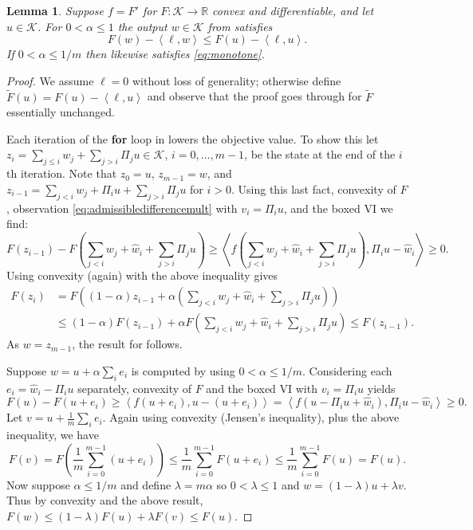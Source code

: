 \documentclass[letterpaper,final,12pt,reqno]{amsart}
\theoremstyle{cstyle}
\newtheorem{lemma}[theorem]{Lemma}
\theoremstyle{cstyle*}
\theoremstyle{dstyle}
\numberwithin{equation}{section}
\numberwithin{figure}{section}
\numberwithin{table}{section}
\numberwithin{theorem}{section}
\newcommand{\RR}{\mathbb{R}}
\newcommand{\cK}{\mathcal{K}}
\newcommand{\ip}[2]{\left<#1,#2\right>}
\begin{document}
\begin{lemma}  Suppose $f=F'$ for $F:\cK\to\RR$ convex and differentiable, and let $u\in\cK$.  For $0<\alpha\le 1$ the output $w \in \cK$ from  satisfies
\begin{equation}
F(w) - \ip{\ell}{w} \le F(u) - \ip{\ell}{u}.  \label{eq:monotone}
\end{equation}
If $0 < \alpha \le 1/m$ then  likewise satisfies \eqref{eq:monotone}.
\end{lemma}

\begin{proof}  We assume $\ell=0$ without loss of generality; otherwise define $\tilde F(u)=F(u) - \ip{\ell}{u}$ and observe that the proof goes through for $\tilde F$ essentially unchanged.

Each iteration of the \textbf{for} loop in  lowers the objective value.  To show this let $z_{i} = \sum_{j\le i} w_j + \sum_{j > i} \Pi_j u \in \cK$, $i=0,\dots,m-1$, be the state at the end of the $i$th iteration.  Note that $z_0=u$, $z_{m-1}=w$, and $z_{i-1} = \sum_{j < i} w_j + \Pi_i u + \sum_{j > i} \Pi_j u$ for $i>0$.  Using this last fact, convexity of $F$, observation \eqref{eq:admissibledifferencemult} with $v_i=\Pi_i u$, and the boxed VI we find:
\begin{equation*}
F(z_{i-1}) - F\left(\sum_{j<i} w_j + \hat w_i + \sum_{j > i} \Pi_j u\right) \ge \ip{f\left(\sum_{j<i} w_j + \hat w_i + \sum_{j > i} \Pi_j u\right)}{\Pi_i u - \hat w_i} \ge 0.
\end{equation*}
Using convexity (again) with the above inequality gives
\begin{align*}
F(z_i) &= F\left((1-\alpha) z_{i-1} + \alpha \left(\sum_{j<i} w_j + \hat w_i + \sum_{j > i} \Pi_j u\right)\right) \\
&\le  (1-\alpha) F(z_{i-1}) + \alpha F\left(\sum_{j<i} w_j + \hat w_i + \sum_{j > i} \Pi_j u\right) \le F(z_{i-1}).
\end{align*}
As $w = z_{m-1}$, the result for  follows.

Suppose $w=u+\alpha\sum_i e_i$ is computed by  using $0<\alpha \le 1/m$.  Considering each $e_i=\hat w_i - \Pi_i u$ separately, convexity of $F$ and the boxed VI with $v_i=\Pi_i u$ yields
\begin{equation}
F(u) - F(u+e_i) \ge \ip{f(u+e_i)}{u-(u+e_i)} = \ip{f(u-\Pi_i u + \hat w_i)}{\Pi_i u - \hat w_i} \ge 0. \label{eq:cdaddonereduction}
\end{equation}
Let $v = u+ \frac{1}{m} \sum_i e_i$.  Again using convexity (Jensen's inequality), plus the above inequality, we have
\begin{equation*}
F(v) = F\left(\frac{1}{m} \sum_{i=0}^{m-1} (u+e_i)\right) \le \frac{1}{m} \sum_{i=0}^{m-1} F(u+e_i) \le \frac{1}{m} \sum_{i=0}^{m-1} F(u) = F(u).
\end{equation*}
Now suppose $\alpha \le 1/m$ and define $\lambda = m\alpha$ so $0<\lambda\le 1$ and $w = (1-\lambda) u + \lambda v$.  Thus by convexity and the above result, $F(w) \le (1-\lambda) F(u) + \lambda F(v) \le F(u)$.
\end{proof}
\end{document}
